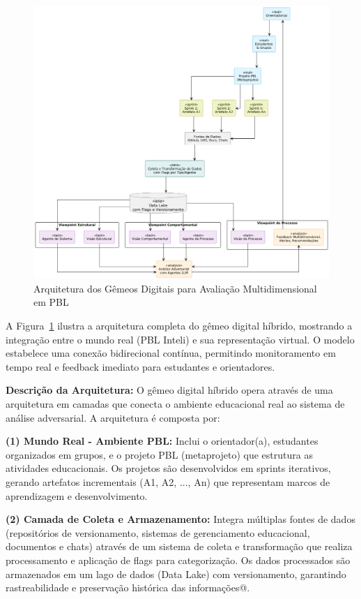 \documentclass[english, spanish, brazilian]{modelo_dt}
\begin{document}
\begin{figure}[htbp]
  \centering
  \includegraphics[width=\linewidth,height=0.8\textheight,keepaspectratio]{assets/f1.png}
  \caption{Arquitetura dos Gêmeos Digitais para Avaliação Multidimensional em PBL}
  \label{fig:gemeo-digital-pbl}
\end{figure}

A Figura~\ref{fig:gemeo-digital-pbl} ilustra a arquitetura completa do gêmeo
digital híbrido, mostrando a integração entre o mundo real (PBL Inteli) e sua
representação virtual. O modelo estabelece uma conexão bidirecional contínua,
permitindo monitoramento em tempo real e feedback imediato para estudantes e
orientadores\@.

\textbf{Descrição da Arquitetura:} O gêmeo digital híbrido opera através de uma arquitetura em camadas que conecta o ambiente educacional real ao sistema de análise adversarial. A arquitetura é composta por:

\textbf{(1) Mundo Real - Ambiente PBL:} Inclui o orientador(a), estudantes organizados em grupos, e o projeto PBL (metaprojeto) que estrutura as atividades educacionais. Os projetos são desenvolvidos em sprints iterativos, gerando artefatos incrementais (A1, A2, ..., An) que representam marcos de aprendizagem e desenvolvimento\@.

\textbf{(2) Camada de Coleta e Armazenamento:} Integra múltiplas fontes de dados (repositórios de versionamento, sistemas de gerenciamento educacional, documentos e chats) através de um sistema de coleta e transformação que realiza processamento e aplicação de flags para categorização. Os dados processados são armazenados em um lago de dados (Data Lake) com versionamento, garantindo rastreabilidade e preservação histórica das informações@.
\end{document}
